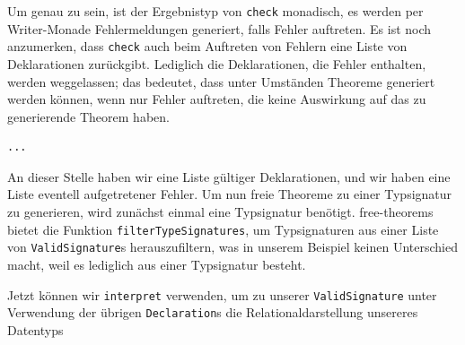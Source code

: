 Um genau zu sein, ist der Ergebnistyp von \texttt{check} monadisch, es werden per Writer-Monade Fehlermeldungen
generiert, falls Fehler auftreten. Es ist noch anzumerken, dass \texttt{check} auch beim Auftreten von Fehlern eine Liste
von Deklarationen zurückgibt. Lediglich die Deklarationen, die Fehler enthalten, werden weggelassen; das bedeutet, dass
unter Umständen Theoreme generiert werden können, wenn nur Fehler auftreten, die keine Auswirkung auf das zu generierende
Theorem haben.

\begin{verbatim}
...
\end{verbatim}

An dieser Stelle haben wir eine Liste gültiger Deklarationen, und wir haben eine Liste eventell aufgetretener Fehler. Um nun
freie Theoreme zu einer Typsignatur zu generieren, wird zunächst einmal eine Typsignatur benötigt. free-theorems bietet die
Funktion \texttt{filterTypeSignatures}, um Typsignaturen aus einer Liste von \texttt{ValidSignature}s herauszufiltern, was in
unserem Beispiel keinen Unterschied macht, weil es lediglich aus einer Typsignatur besteht.

Jetzt können wir \texttt{interpret} verwenden, um zu unserer \texttt{ValidSignature} unter Verwendung der übrigen
\texttt{Declaration}s die Relationaldarstellung unsereres Datentyps
